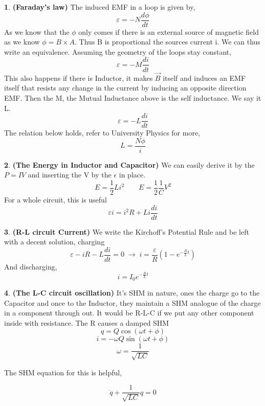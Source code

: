 \documentclass[10pt,letterpaper,twocolumn]{article}
\theoremstyle{definition}
\newtheorem{fct}{\framebox[0.07\textwidth]{{\sffamily Fact}}}[section]
\theoremstyle{definition}
\theoremstyle{definition}
\begin{document}
\begin{fct} \textbf{(Faraday's law)}
The induced EMF in a loop is given by, 
\[ \varepsilon = - N \frac{d \phi}{dt} \]
As we know that the $\phi$ only comes if there is an external source of magnetic field as we know $\phi = B \times A$. Thus B is proportional the sources current i. We can thus write an equivalence. Assuming the geometry of the loops stay constant,
\[\varepsilon = -M \frac{di}{dt} \]
This also happens if there is Inductor, it makes $\vec{B}$ itself and induces an EMF itself that resists any change in the current by inducing an opposite direction EMF. Then the M, the Mutual Inductance above is the self inductance. We say it L.
\[\varepsilon = -L \frac{di}{dt} \]
The relation below holds, refer to University Physics for more,
\[  L = \frac{N \phi}{i}
\]
\end{fct}
\begin{fct} \textbf{(The Energy in Inductor and Capacitor)}
We can easily derive it by the $P = I V$ and inserting the V by the $\epsilon$ in place.
\[E = \frac{1}{2} L i^2  \qquad 	E = \frac{1}{2} \frac{1}{C} V^2	\]
For a whole circuit, this is useful
\[ \varepsilon i = i^2 R + Li \frac{di}{dt} 
\]

\end{fct}
\begin{fct} \textbf{(R-L circuit Current)} 
We write the Kirchoff's Potential Rule and be left with a decent solution, charging
\[ \varepsilon - iR - L \frac{di}{dt} =0 \; \rightarrow \; i = \frac{\varepsilon}{R} (1 - e^{ -\frac{R}{L} t }) \]
And discharging,
\[ i = I_0 e^{ -\frac{R}{L} t}
\]
\end{fct}

\begin{fct} \textbf{(The L-C circuit oscillation)} 
It's SHM in nature, ones the charge go to the Capacitor and once to the Inductor, they maintain a SHM analogue of the charge in a component through out. It would be R-L-C if we put any other component inside with resistance.
The R causes a damped SHM
\[ q = Q \cos ( \omega t + \phi) \]
\[ i = -\omega Q \sin (\omega t + \phi) \]
\[ \omega = \frac{1}{\sqrt{LC}} \]

The SHM equation for this is helpful,

\[ \ddot{q} + \frac{1}{\sqrt{LC}} q = 0 \]
\end{fct}

\end{document}
